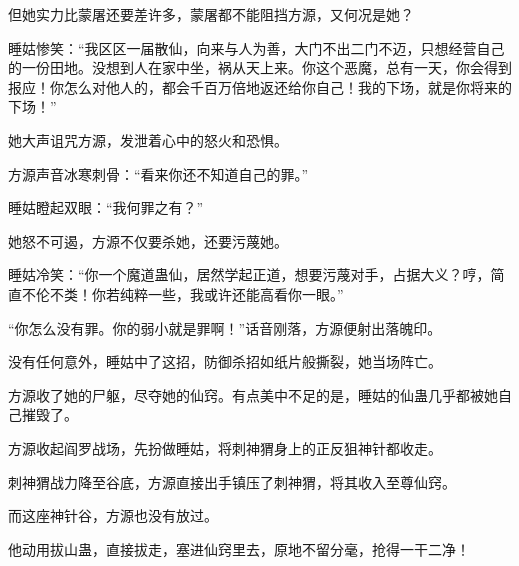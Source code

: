 \begin{this_body}
但她实力比蒙屠还要差许多，蒙屠都不能阻挡方源，又何况是她？

睡姑惨笑：“我区区一届散仙，向来与人为善，大门不出二门不迈，只想经营自己的一份田地。没想到人在家中坐，祸从天上来。你这个恶魔，总有一天，你会得到报应！你怎么对他人的，都会千百万倍地返还给你自己！我的下场，就是你将来的下场！”

她大声诅咒方源，发泄着心中的怒火和恐惧。

方源声音冰寒刺骨：“看来你还不知道自己的罪。”

睡姑瞪起双眼：“我何罪之有？”

她怒不可遏，方源不仅要杀她，还要污蔑她。

睡姑冷笑：“你一个魔道蛊仙，居然学起正道，想要污蔑对手，占据大义？哼，简直不伦不类！你若纯粹一些，我或许还能高看你一眼。”

“你怎么没有罪。你的弱小就是罪啊！”话音刚落，方源便射出落魄印。

没有任何意外，睡姑中了这招，防御杀招如纸片般撕裂，她当场阵亡。

方源收了她的尸躯，尽夺她的仙窍。有点美中不足的是，睡姑的仙蛊几乎都被她自己摧毁了。

方源收起阎罗战场，先扮做睡姑，将刺神猬身上的正反狙神针都收走。

刺神猬战力降至谷底，方源直接出手镇压了刺神猬，将其收入至尊仙窍。

而这座神针谷，方源也没有放过。

他动用拔山蛊，直接拔走，塞进仙窍里去，原地不留分毫，抢得一干二净！

\end{this_body}

